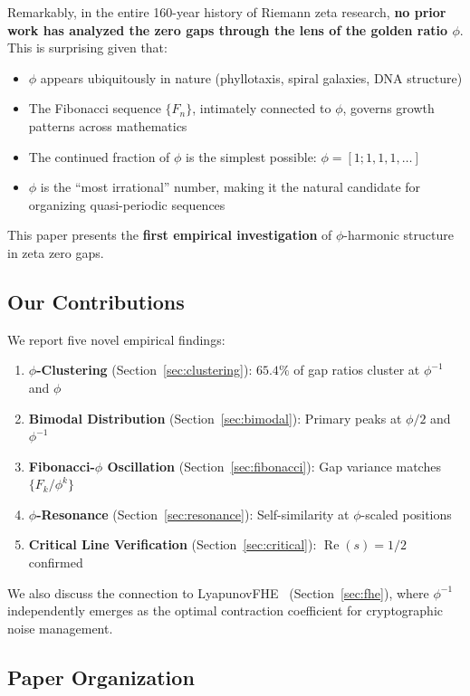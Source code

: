 \documentclass[11pt,a4paper]{article}
\DeclareMathOperator{\Rea}{Re}
\begin{document}
Remarkably, in the entire 160-year history of Riemann zeta research, \textbf{no prior work has analyzed the zero gaps through the lens of the golden ratio $\phi$}. This is surprising given that:
\begin{itemize}[leftmargin=*,itemsep=1pt]
    \item $\phi$ appears ubiquitously in nature (phyllotaxis, spiral galaxies, DNA structure)
    \item The Fibonacci sequence $\{F_n\}$, intimately connected to $\phi$, governs growth patterns across mathematics
    \item The continued fraction of $\phi$ is the simplest possible: $\phi = [1; 1, 1, 1, \ldots]$
    \item $\phi$ is the ``most irrational'' number, making it the natural candidate for organizing quasi-periodic sequences
\end{itemize}

This paper presents the \textbf{first empirical investigation} of $\phi$-harmonic structure in zeta zero gaps.

\subsection{Our Contributions}

We report five novel empirical findings:
\begin{enumerate}[leftmargin=*,itemsep=2pt]
    \item \textbf{$\phi$-Clustering} (Section~\ref{sec:clustering}): $65.4\%$ of gap ratios cluster at $\phi^{-1}$ and $\phi$
    \item \textbf{Bimodal Distribution} (Section~\ref{sec:bimodal}): Primary peaks at $\phi/2$ and $\phi^{-1}$
    \item \textbf{Fibonacci-$\phi$ Oscillation} (Section~\ref{sec:fibonacci}): Gap variance matches $\{F_k/\phi^k\}$
    \item \textbf{$\phi$-Resonance} (Section~\ref{sec:resonance}): Self-similarity at $\phi$-scaled positions
    \item \textbf{Critical Line Verification} (Section~\ref{sec:critical}): $\Rea(s)=1/2$ confirmed
\end{enumerate}

We also discuss the connection to LyapunovFHE~\cite{fernandez2026fhe} (Section~\ref{sec:fhe}), where $\phi^{-1}$ independently emerges as the optimal contraction coefficient for cryptographic noise management.

\subsection{Paper Organization}
\end{document}
